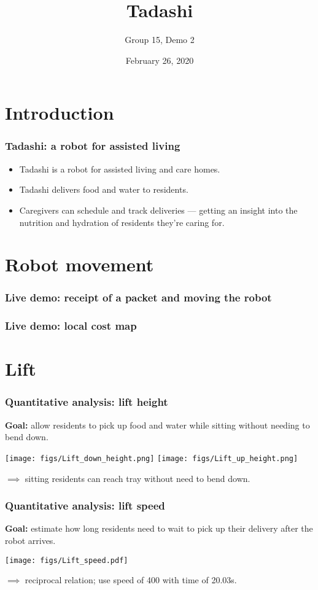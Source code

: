 \documentclass{beamer}
\title{Tadashi}
\subtitle{Group 15, Demo 2}
\institute{\vspace{2em}\texttt{[image: figs/logo.png]}}
\date{February 26, 2020}
\begin{document}
\maketitle
\section{Introduction}
\begin{frame}
  \frametitle{Tadashi: a robot for assisted living}
  \begin{itemize}
    \item Tadashi is a robot for assisted living and care homes.
    \item Tadashi delivers food and water to residents.
    \item Caregivers can schedule and track deliveries --- getting an insight into the nutrition and hydration of residents they're caring for.
  \end{itemize}
\end{frame}

\section{Robot movement}
\begin{frame}
  \frametitle{Live demo: receipt of a packet and moving the robot}
\end{frame}
\begin{frame}
  \frametitle{Live demo: local cost map}
\end{frame}

\section{Lift}
\begin{frame}
  \frametitle{Quantitative analysis: lift height}
  {\bf Goal: } allow residents to pick up food and water while sitting without needing to bend down.
  \begin{center}
    \texttt{[image: figs/Lift\_down\_height.png]}
    \texttt{[image: figs/Lift\_up\_height.png]}
  \end{center}
  $\implies$ sitting residents can reach tray without need to bend down. 
\end{frame}

\begin{frame}
  \frametitle{Quantitative analysis: lift speed}
  {\bf Goal: } estimate how long residents need to wait to pick up their delivery after the robot arrives.
  \begin{center}
    \texttt{[image: figs/Lift\_speed.pdf]}
  \end{center}
  $\implies$ reciprocal relation; use speed of 400 with time of 20.03s.
\end{frame}
\end{document}
